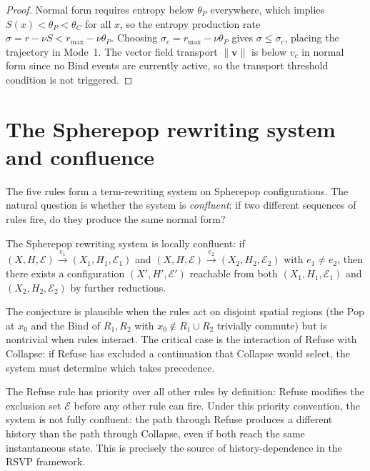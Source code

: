 \documentclass[12pt, oneside]{memoir}
\newcommand{\nnorm}[1]{\lVert #1 \rVert}
\newcommand{\bv}{\mathbf{v}}
\begin{document}
\begin{proof}
Normal form requires entropy below $\theta_P$ everywhere, which implies $S(x) < \theta_P
< \theta_C$ for all $x$, so the entropy production rate $\sigma = r - \nu S < r_{\max} -
\nu \theta_P$.  Choosing $\sigma_c = r_{\max} - \nu \theta_P$ gives $\sigma \le
\sigma_c$, placing the trajectory in Mode~1.  The vector field transport $\nnorm{\bv}$
is below $v_c$ in normal form since no Bind events are currently active, so the transport
threshold condition is not triggered.
\end{proof}

\section{The Spherepop rewriting system and confluence}

The five rules form a term-rewriting system on Spherepop configurations.  The natural
question is whether the system is \emph{confluent}: if two different sequences of rules
fire, do they produce the same normal form?

\begin{conjecture}
\label{conj:confluence}
The Spherepop rewriting system is locally confluent: if $(X, H, \mathcal{E})
\xrightarrow{e_1} (X_1, H_1, \mathcal{E}_1)$ and $(X, H, \mathcal{E})
\xrightarrow{e_2} (X_2, H_2, \mathcal{E}_2)$ with $e_1 \ne e_2$, then there exists a
configuration $(X', H', \mathcal{E}')$ reachable from both $(X_1, H_1, \mathcal{E}_1)$
and $(X_2, H_2, \mathcal{E}_2)$ by further reductions.
\end{conjecture}

The conjecture is plausible when the rules act on disjoint spatial regions (the Pop at
$x_0$ and the Bind of $R_1, R_2$ with $x_0 \notin R_1 \cup R_2$ trivially commute) but
is nontrivial when rules interact.  The critical case is the interaction of Refuse with
Collapse: if Refuse has excluded a continuation that Collapse would select, the system
must determine which takes precedence.

\begin{remark}
The Refuse rule has priority over all other rules by definition: Refuse modifies the
exclusion set $\mathcal{E}$ before any other rule can fire.  Under this priority
convention, the system is not fully confluent: the path through Refuse produces a
different history than the path through Collapse, even if both reach the same
instantaneous state.  This is precisely the source of history-dependence in the RSVP
framework.
\end{remark}
\end{document}
